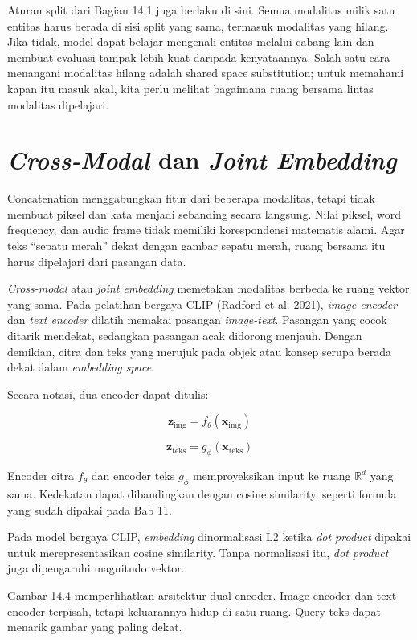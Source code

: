 Aturan split dari Bagian 14.1 juga berlaku di sini. Semua modalitas milik satu entitas harus berada di sisi split yang sama, termasuk modalitas yang hilang. Jika tidak, model dapat belajar mengenali entitas melalui cabang lain dan membuat evaluasi tampak lebih kuat daripada kenyataannya. Salah satu cara menangani modalitas hilang adalah shared space substitution; untuk memahami kapan itu masuk akal, kita perlu melihat bagaimana ruang bersama lintas modalitas dipelajari.

\section{\texorpdfstring{\emph{Cross-Modal} dan \emph{Joint Embedding}}{Cross-Modal dan Joint Embedding}}\label{cross-modal-dan-joint-embedding}

Concatenation menggabungkan fitur dari beberapa modalitas, tetapi tidak membuat piksel dan kata menjadi sebanding secara langsung. Nilai piksel, word frequency, dan audio frame tidak memiliki korespondensi matematis alami. Agar teks ``sepatu merah'' dekat dengan gambar sepatu merah, ruang bersama itu harus dipelajari dari pasangan data.

\emph{Cross-modal} atau \emph{joint embedding} memetakan modalitas berbeda ke ruang vektor yang sama. Pada pelatihan bergaya CLIP (Radford et al. 2021), \emph{image encoder} dan \emph{text encoder} dilatih memakai pasangan \emph{image-text}. Pasangan yang cocok ditarik mendekat, sedangkan pasangan acak didorong menjauh. Dengan demikian, citra dan teks yang merujuk pada objek atau konsep serupa berada dekat dalam \emph{embedding space}.

Secara notasi, dua encoder dapat ditulis:

\[
\mathbf{z}_{\text{img}} = f_{\theta}(\mathbf{x}_{\text{img}})
\]

\[
\mathbf{z}_{\text{teks}} = g_{\phi}(\mathbf{x}_{\text{teks}})
\]

Encoder citra \(f_{\theta}\) dan encoder teks \(g_{\phi}\) memproyeksikan input ke ruang \(\mathbb{R}^d\) yang sama. Kedekatan dapat dibandingkan dengan cosine similarity, seperti formula yang sudah dipakai pada Bab 11.

Pada model bergaya CLIP, \emph{embedding} dinormalisasi L2 ketika \emph{dot product} dipakai untuk merepresentasikan cosine similarity. Tanpa normalisasi itu, \emph{dot product} juga dipengaruhi magnitudo vektor.

Gambar 14.4 memperlihatkan arsitektur dual encoder. Image encoder dan text encoder terpisah, tetapi keluarannya hidup di satu ruang. Query teks dapat menarik gambar yang paling dekat.

